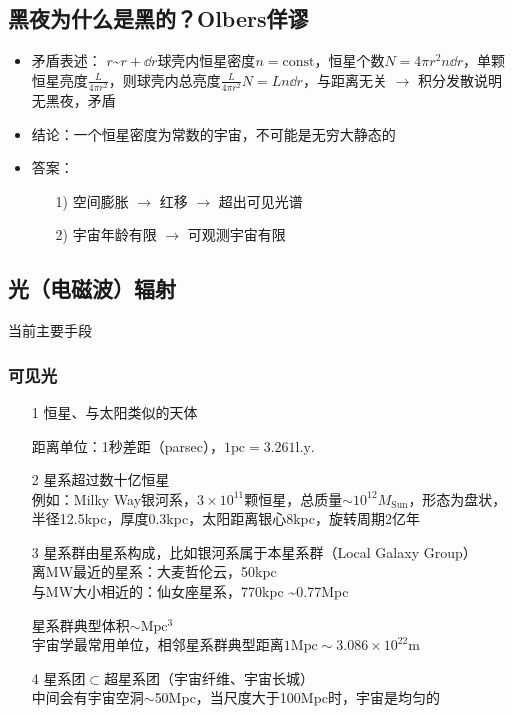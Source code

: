 \subsection{黑夜为什么是黑的？Olbers佯谬}
\begin{itemize}
	\item 矛盾表述：
	$r$\textasciitilde$r + \dd r$球壳内恒星密度$n = \mathrm{const}$，恒星个数$N = 4 \pi r^2 n \dd r$，单颗恒星亮度$\frac{L}{4 \pi r^2}$，则球壳内总亮度$\frac{L}{4 \pi r^2} N = L n \dd r$，与距离无关 $\rightarrow$ 积分发散说明无黑夜，矛盾
	\item 结论：一个恒星密度为常数的宇宙，不可能是无穷大静态的
	\item 答案：
	\begin{itemize}
		\item[1)] 空间膨胀 $\rightarrow$ 红移 $\rightarrow$ 超出可见光谱
		\item[2)] 宇宙年龄有限 $\rightarrow$ 可观测宇宙有限
	\end{itemize}
\end{itemize}

\subsection{光（电磁波）辐射}
\par 
当前主要手段

\subsubsection{可见光}
\begin{itemize}
	\item[1] 恒星、与太阳类似的天体
	\begin{cnote}
		距离单位：1秒差距（parsec），$1 \mathrm{pc} = 3.261 \mathrm{l.y.}$
	\end{cnote}
	
	\item[2] 星系\quad 超过数十亿恒星 \\
	例如：Milky Way银河系，$3 \times 10^{11}$颗恒星，总质量$\sim 10^{12} M_{\text{Sun}}$，形态为盘状，半径12.5kpc，厚度0.3kpc，太阳距离银心8kpc，旋转周期2亿年
	
	\item[3] 星系群\quad 由星系构成，比如银河系属于本星系群（Local Galaxy Group） \\
	离MW最近的星系：大麦哲伦云，50kpc \\
	与MW大小相近的：仙女座星系，770kpc \textasciitilde 0.77Mpc
	\begin{cnote}
		星系群典型体积$\sim \mathrm{Mpc^3}$ \\
		宇宙学最常用单位，相邻星系群典型距离$1 \mathrm{Mpc} \sim 3.086\times 10^{22} \mathrm{m}$
	\end{cnote}

	\item[4] 星系团$\subset$超星系团（宇宙纤维、宇宙长城） \\
	中间会有宇宙空洞$\sim$50Mpc，当尺度大于100Mpc时，宇宙是均匀的
\end{itemize}

